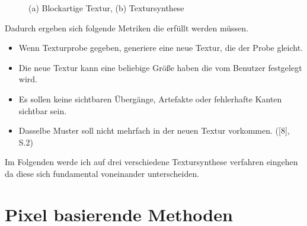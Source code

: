 \documentclass[12pt]{report}
\begin{document}
\begin{figure}[H]
    \centering
    \qquad
    \caption{(a) Blockartige Textur, (b) Textursynthese}%
\end{figure}

\noindent Dadurch ergeben sich folgende Metriken die erfüllt werden müssen.

\begin{itemize}
    \item Wenn Texturprobe gegeben, generiere eine neue Textur, die der Probe gleicht.
    \item Die neue Textur kann eine beliebige Größe haben die vom Benutzer festgelegt wird.
    \item Es sollen keine sichtbaren Übergänge, Artefakte oder fehlerhafte Kanten sichtbar sein.
    \item Dasselbe Muster soll nicht mehrfach in der neuen Textur vorkommen. {([8], S.2)}
\end{itemize}

\noindent Im Folgenden werde ich auf drei verschiedene Textursynthese verfahren eingehen da diese sich fundamental voneinander unterscheiden.

\section{Pixel basierende Methoden}
\end{document}
